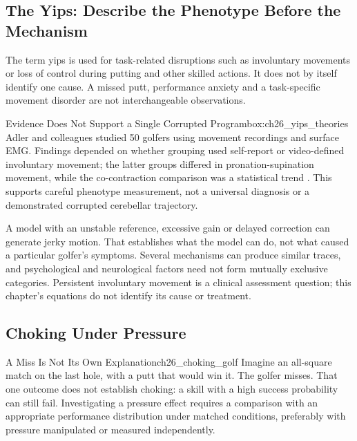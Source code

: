 \subsection{The Yips: Describe the Phenotype Before the Mechanism}
\label{subsec:ch26_yips}

The term yips is used for task-related disruptions such as involuntary movements or loss of control during putting and other skilled actions. It does not by itself identify one cause. A missed putt, performance anxiety and a task-specific movement disorder are not interchangeable observations.

\begin{principle}{Evidence Does Not Support a Single Corrupted Program}{box:ch26_yips_theories}
Adler and colleagues studied 50 golfers using movement recordings and surface EMG. Findings depended on whether grouping used self-report or video-defined involuntary movement; the latter groups differed in pronation-supination movement, while the co-contraction comparison was a statistical trend \citep{Adler2011Yips}. This supports careful phenotype measurement, not a universal diagnosis or a demonstrated corrupted cerebellar trajectory.
\end{principle}

A model with an unstable reference, excessive gain or delayed correction can generate jerky motion. That establishes what the model can do, not what caused a particular golfer's symptoms. Several mechanisms can produce similar traces, and psychological and neurological factors need not form mutually exclusive categories. Persistent involuntary movement is a clinical assessment question; this chapter's equations do not identify its cause or treatment.

\subsection{Choking Under Pressure}
\label{subsec:ch26_choking}

\begin{example}{A Miss Is Not Its Own Explanation}{ch26_choking_golf}
Imagine an all-square match on the last hole, with a putt that would win it. The golfer misses. That one outcome does not establish choking: a skill with a high success probability can still fail. Investigating a pressure effect requires a comparison with an appropriate performance distribution under matched conditions, preferably with pressure manipulated or measured independently.
\end{example}

